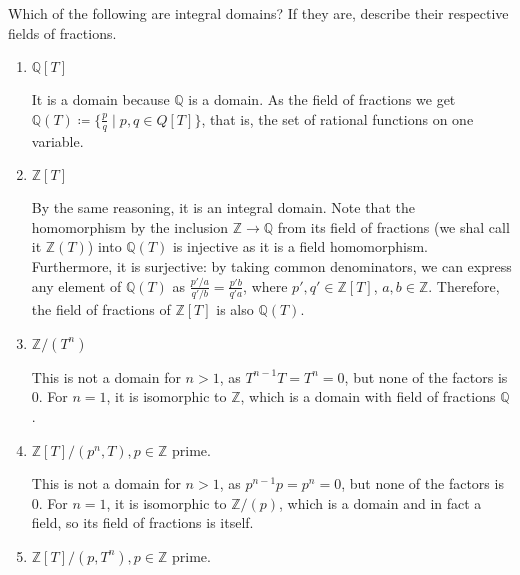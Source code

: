 \begin{problem}
    Which of the following are integral domains?
    If they are, describe their respective fields of fractions.
    
    \begin{enumerate}
        \item $\mathbb{Q}[T]$
        \begin{sol}
            It is a domain because $\mathbb{Q}$ is a domain.
            As the field of fractions we get $\mathbb{Q}(T) \coloneqq
            \{\frac{p}{q} \mid p, q \in Q[T]\}$, that is, the set of
            rational functions on one variable.
        \end{sol}
        \item $\mathbb{Z}[T]$
        \begin{sol}
            By the same reasoning, it is an integral domain.
            Note that the homomorphism by the inclusion $\mathbb{Z} \rightarrow \mathbb{Q}$
            from its field of fractions (we shal call it $\mathbb{Z}(T)$)
            into $\mathbb{Q}(T)$ is injective as it is a field homomorphism.
            Furthermore, it is surjective: by taking common denominators, we can express
            any element of $\mathbb{Q}(T)$ as $\frac{p'/a}{q'/b} = \frac{p'b}{q'a}$,
            where $p', q' \in \mathbb{Z}[T]$, $a, b \in \mathbb{Z}$.
            Therefore, the field of fractions of $\mathbb{Z}[T]$ is also $\mathbb{Q}(T)$.
        \end{sol}
        \item $\mathbb{Z}/(T^n)$
        \begin{sol}
            This is not a domain for $n > 1$, as $T^{n-1}T = T^n = 0$,
            but none of the factors is $0$.
            For $n = 1$, it is isomorphic to $\mathbb{Z}$, which is a domain
            with field of fractions $\mathbb{Q}$.
        \end{sol}
        \item  $\mathbb{Z}[T]/(p^n, T), p \in \mathbb{Z}$ prime.
        \begin{sol}
            This is not a domain for $n > 1$, as $p^{n-1}p = p^n = 0$,
            but none of the factors is $0$.
            For $n = 1$, it is isomorphic to $\mathbb{Z}/(p)$, which is a domain
            and in fact a field, so its field of fractions is itself.
        \end{sol}
        \item $\mathbb{Z}[T]/(p, T^n), p \in \mathbb{Z}$ prime.
        \begin{sol}

\end{sol}
\end{enumerate}
\end{problem}

